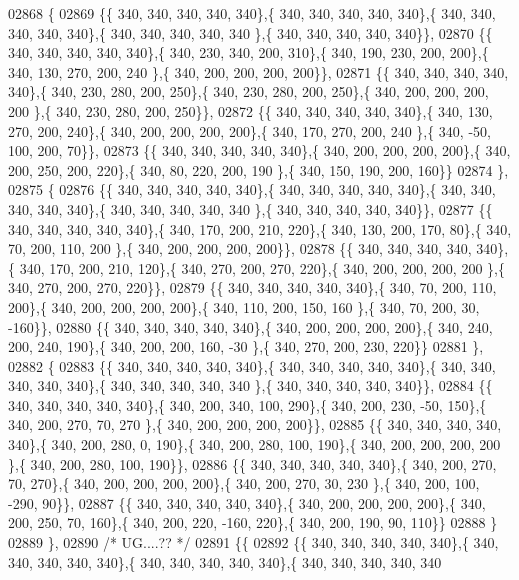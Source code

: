 \begin{DoxyCode}
02868 \{
02869 \{\{ 340, 340, 340, 340, 340\},\{ 340, 340, 340, 340, 340\},\{ 340, 340, 340, 340, 340\},\{ 340, 340, 340, 340, 340
      \},\{ 340, 340, 340, 340, 340\}\},
02870 \{\{ 340, 340, 340, 340, 340\},\{ 340, 230, 340, 200, 310\},\{ 340, 190, 230, 200, 200\},\{ 340, 130, 270, 200, 240
      \},\{ 340, 200, 200, 200, 200\}\},
02871 \{\{ 340, 340, 340, 340, 340\},\{ 340, 230, 280, 200, 250\},\{ 340, 230, 280, 200, 250\},\{ 340, 200, 200, 200, 200
      \},\{ 340, 230, 280, 200, 250\}\},
02872 \{\{ 340, 340, 340, 340, 340\},\{ 340, 130, 270, 200, 240\},\{ 340, 200, 200, 200, 200\},\{ 340, 170, 270, 200, 240
      \},\{ 340, -50, 100, 200,  70\}\},
02873 \{\{ 340, 340, 340, 340, 340\},\{ 340, 200, 200, 200, 200\},\{ 340, 200, 250, 200, 220\},\{ 340,  80, 220, 200, 190
      \},\{ 340, 150, 190, 200, 160\}\}
02874 \},
02875 \{
02876 \{\{ 340, 340, 340, 340, 340\},\{ 340, 340, 340, 340, 340\},\{ 340, 340, 340, 340, 340\},\{ 340, 340, 340, 340, 340
      \},\{ 340, 340, 340, 340, 340\}\},
02877 \{\{ 340, 340, 340, 340, 340\},\{ 340, 170, 200, 210, 220\},\{ 340, 130, 200, 170,  80\},\{ 340,  70, 200, 110, 200
      \},\{ 340, 200, 200, 200, 200\}\},
02878 \{\{ 340, 340, 340, 340, 340\},\{ 340, 170, 200, 210, 120\},\{ 340, 270, 200, 270, 220\},\{ 340, 200, 200, 200, 200
      \},\{ 340, 270, 200, 270, 220\}\},
02879 \{\{ 340, 340, 340, 340, 340\},\{ 340,  70, 200, 110, 200\},\{ 340, 200, 200, 200, 200\},\{ 340, 110, 200, 150, 160
      \},\{ 340,  70, 200,  30, -160\}\},
02880 \{\{ 340, 340, 340, 340, 340\},\{ 340, 200, 200, 200, 200\},\{ 340, 240, 200, 240, 190\},\{ 340, 200, 200, 160, -30
      \},\{ 340, 270, 200, 230, 220\}\}
02881 \},
02882 \{
02883 \{\{ 340, 340, 340, 340, 340\},\{ 340, 340, 340, 340, 340\},\{ 340, 340, 340, 340, 340\},\{ 340, 340, 340, 340, 340
      \},\{ 340, 340, 340, 340, 340\}\},
02884 \{\{ 340, 340, 340, 340, 340\},\{ 340, 200, 340, 100, 290\},\{ 340, 200, 230, -50, 150\},\{ 340, 200, 270,  70, 270
      \},\{ 340, 200, 200, 200, 200\}\},
02885 \{\{ 340, 340, 340, 340, 340\},\{ 340, 200, 280,   0, 190\},\{ 340, 200, 280, 100, 190\},\{ 340, 200, 200, 200, 200
      \},\{ 340, 200, 280, 100, 190\}\},
02886 \{\{ 340, 340, 340, 340, 340\},\{ 340, 200, 270,  70, 270\},\{ 340, 200, 200, 200, 200\},\{ 340, 200, 270,  30, 230
      \},\{ 340, 200, 100, -290,  90\}\},
02887 \{\{ 340, 340, 340, 340, 340\},\{ 340, 200, 200, 200, 200\},\{ 340, 200, 250,  70, 160\},\{ 340, 200, 220, -160, 
      220\},\{ 340, 200, 190,  90, 110\}\}
02888 \}
02889 \},
02890 \textcolor{comment}{/* UG....?? */}
02891 \{\{
02892 \{\{ 340, 340, 340, 340, 340\},\{ 340, 340, 340, 340, 340\},\{ 340, 340, 340, 340, 340\},\{ 340, 340, 340, 340, 340

\end{DoxyCode}
